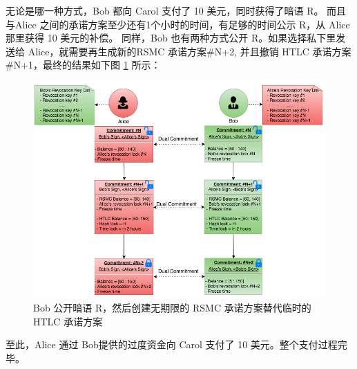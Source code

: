 \begin{appendices}
无论是哪一种方式，Bob 都向 Carol 支付了 10 美元，同时获得了暗语 R。
而且与Alice 之间的承诺方案至少还有1个小时的时间，有足够的时间公示 R，从 Alice 那里获得 10 美元的补偿。
同样，Bob 也有两种方式公开 R。如果选择私下里发送给 Alice，就需要再生成新的RSMC 承诺方案\#N+2, 并且撤销 HTLC 承诺方案\#N+1，最终的结果如下图 \ref{fig:A_alice_bob_3} 所示：
\begin{figure}[h!]
    \centering
    \includegraphics[width=12cm, keepaspectratio]{../images/alice_bob_3.png}
    \caption{Bob 公开暗语 R，然后创建无期限的 RSMC 承诺方案替代临时的 HTLC 承诺方案}
    \label{fig:A_alice_bob_3}
\end{figure}

至此，Alice 通过 Bob提供的过度资金向 Carol 支付了 10 美元。整个支付过程完毕。
\end{appendices}
